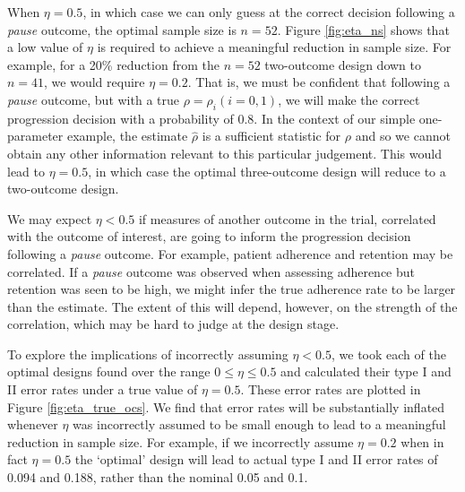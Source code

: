 \documentclass[referee, lineno, pdflatex,sn-vancouver,Numbered]{sn-jnl}%
\theoremstyle{thmstyleone}%
\theoremstyle{thmstyletwo}%
\theoremstyle{thmstylethree}%
\begin{document}
When $\eta = 0.5$, in which case we can only guess at the correct decision following a \emph{pause} outcome, the optimal sample size is $n = 52$. %
Figure \ref{fig:eta_ns} shows that a low value of $\eta$ is required to achieve a meaningful reduction in sample size. For example, for a 20\% reduction from the $n = 52$ two-outcome design down to $n = 41$, we would require $\eta = 0.2$. That is, we must be confident that following a \emph{pause} outcome, but with a true $\rho = \rho_i (i = 0,1)$, we will make the correct progression decision with a probability of 0.8. In the context of our simple one-parameter example, the estimate $\hat{\rho}$ is a sufficient statistic for $\rho$ and so we cannot obtain any other information relevant to this particular judgement. This would lead to $\eta = 0.5$, in which case the optimal three-outcome design will reduce to a two-outcome design.

We may expect $\eta < 0.5$ if measures of another outcome in the trial, correlated with the outcome of interest, are going to inform the progression decision following a \emph{pause} outcome. For example, patient adherence and retention may be correlated. If a \emph{pause} outcome was observed when assessing adherence but retention was seen to be high, we might infer the true adherence rate to be larger than the estimate. The extent of this will depend, however, on the strength of the correlation, which may be hard to judge at the design stage. 

To explore the implications of incorrectly assuming $\eta < 0.5$, we took each of the optimal designs found over the range $0 \leq \eta \leq 0.5$ and calculated their type I and II error rates under a true value of $\eta = 0.5$. These error rates are plotted in Figure \ref{fig:eta_true_ocs}. We find that error rates will be substantially inflated whenever $\eta$ was incorrectly assumed to be small enough to lead to a meaningful reduction in sample size. For example, if we incorrectly assume $\eta = 0.2$ when in fact $\eta = 0.5$ the `optimal' design will lead to actual type I and II error rates of 0.094 and 0.188, rather than the nominal 0.05 and 0.1.
\end{document}
